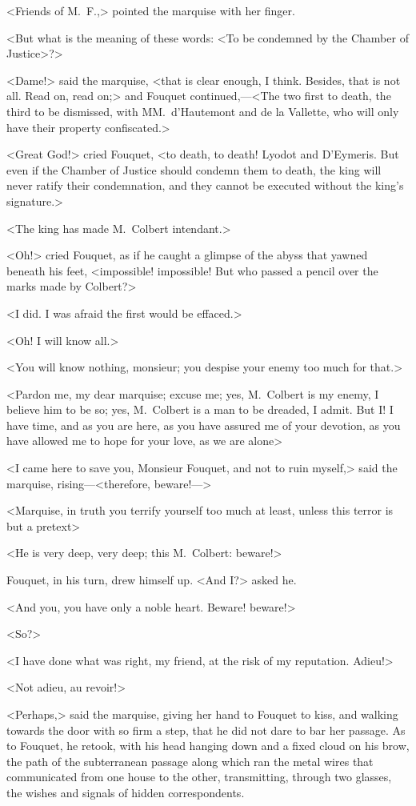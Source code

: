 <Friends of M.~F.,> pointed the marquise with her finger.

<But what is the meaning of these words: <To be condemned by the Chamber of Justice>?>

<Dame!> said the marquise, <that is clear enough, I think. Besides, that is not all. Read on, read on;> and Fouquet continued,—<The two first to death, the third to be dismissed, with MM.~d'Hautemont and de la Vallette, who will only have their property confiscated.>

<Great God!> cried Fouquet, <to death, to death! Lyodot and D'Eymeris. But even if the Chamber of Justice should condemn them to death, the king will never ratify their condemnation, and they cannot be executed without the king's signature.>

<The king has made M.~Colbert intendant.>

<Oh!> cried Fouquet, as if he caught a glimpse of the abyss that yawned beneath his feet, <impossible! impossible! But who passed a pencil over the marks made by Colbert?>

<I did. I was afraid the first would be effaced.>

<Oh! I will know all.>

<You will know nothing, monsieur; you despise your enemy too much for that.>

<Pardon me, my dear marquise; excuse me; yes, M.~Colbert is my enemy, I believe him to be so; yes, M.~Colbert is a man to be dreaded, I admit. But I\@! I have time, and as you are here, as you have assured me of your devotion, as you have allowed me to hope for your love, as we are alone\longdash>

<I came here to save you, Monsieur Fouquet, and not to ruin myself,> said the marquise, rising—<therefore, beware!—>

<Marquise, in truth you terrify yourself too much at least, unless this terror is but a pretext\longdash>

<He is very deep, very deep; this M.~Colbert: beware!>

Fouquet, in his turn, drew himself up. <And I\@?> asked he.

<And you, you have only a noble heart. Beware! beware!>

<So?>

<I have done what was right, my friend, at the risk of my reputation. Adieu!>

<Not adieu, au revoir!>

<Perhaps,> said the marquise, giving her hand to Fouquet to kiss, and walking towards the door with so firm a step, that he did not dare to bar her passage. As to Fouquet, he retook, with his head hanging down and a fixed cloud on his brow, the path of the subterranean passage along which ran the metal wires that communicated from one house to the other, transmitting, through two glasses, the wishes and signals of hidden correspondents. 